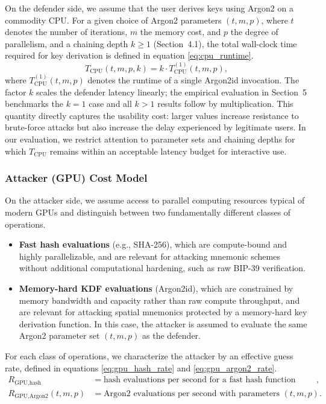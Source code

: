 \documentclass[journal,article,submit,pdftex,moreauthors]{Definitions/mdpi}
\newcommand{\add}[1]{#1}
\newcommand{\add}[1]{\added{#1}}
\begin{document}
On the defender side, we assume that the user derives keys using Argon2 on a commodity CPU. For a given choice of Argon2 parameters $(t, m, p)$, where $t$ denotes the number of iterations, $m$ the memory cost, and $p$ the degree of parallelism, and a chaining depth $k \geq 1$ (Section~4.1), the total wall-clock time required for key derivation is defined in equation \ref{eq:cpu_runtime}.
\begin{equation}
T_{\text{CPU}}(t, m, p, k) = k \cdot T_{\text{CPU}}^{(1)}(t, m, p),
\label{eq:cpu_runtime}
\end{equation}
where $T_{\text{CPU}}^{(1)}(t, m, p)$ denotes the runtime of a single Argon2id invocation. \add{The factor $k$ scales the defender latency linearly; the empirical evaluation in Section~5 benchmarks the $k=1$ case and all $k > 1$ results follow by multiplication.} This quantity directly captures the usability cost: larger values increase resistance to brute-force attacks but also increase the delay experienced by legitimate users. In our evaluation, we restrict attention to parameter sets and chaining depths for which $T_{\text{CPU}}$ remains within an acceptable latency budget for interactive use.

\subsubsection{Attacker (GPU) Cost Model}

On the attacker side, we assume access to parallel computing resources typical of modern GPUs and distinguish between two fundamentally different classes of operations.
\begin{itemize}
\item \textbf{Fast hash evaluations} (e.g., SHA-256), which are compute-bound and highly parallelizable, and are relevant for attacking mnemonic schemes without additional computational hardening, such as raw BIP-39 verification.
\item \textbf{Memory-hard KDF evaluations} (Argon2id), which are constrained by memory bandwidth and capacity rather than raw compute throughput, and are relevant for attacking spatial mnemonics protected by a memory-hard key derivation function. In this case, the attacker is assumed to evaluate the same Argon2 parameter set $(t, m, p)$ as the defender.
\end{itemize}

For each class of operations, we characterize the attacker by an effective guess rate, defined in equations \ref{eq:gpu_hash_rate} and \ref{eq:gpu_argon2_rate}.
\begin{align}
R_{\text{GPU,hash}} &= \text{hash evaluations per second for a fast hash function (e.g., SHA-256)}, \label{eq:gpu_hash_rate} \\
R_{\text{GPU,Argon2}}(t,m,p) &= \text{Argon2 evaluations per second with parameters }(t,m,p). \label{eq:gpu_argon2_rate}
\end{align}
\end{document}
